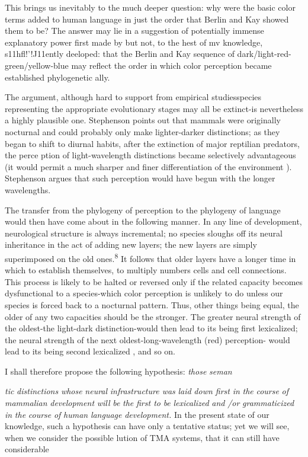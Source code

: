 This brings us inevitably to the much deeper question: why were the basic color terms added to human language in just the order that Berlin and Kay showed them to be? The answer may lie in a suggestion of potentially immense explanatory power first made by \citet{Stephenson1973} but not, to the hest of mv knowledge, s11hfl!'!J11ently deeloped: that the Berlin and Kay sequence of dark/light-red-green/yellow-blue may reflect the order in which color perception became established phylogenetic ally.

The argument, although hard to support from empirical studies\-species representing the appropriate evolutionary stages may all be extinct-is nevertheless a highly plausible one. Stephenson points out that mammals were originally nocturnal and could probably only make
lighter-darker distinctions; as they began to shift to diurnal habits, after the extinction of major reptilian predators, the perce ption of light-wavelength distinctions became selectively advantageous (it 
would permit a much sharper and finer differentiation of the environ\-ment ). Stephenson argues that such perception would have begun with the longer wavelengths.

The transfer from the phylogeny of perception to the phylogeny
of language would then have come about in the following manner. In any line of development, neurological structure is always incremental; no species sloughs off its neural inheritance in the act of adding new layers; the new layers are simply superimposed on the old ones.\textsuperscript{8} It follows that older layers have a longer time in which to establish themselves, to multiply numbers cells and cell connections. This process is likely to be halted or reversed only if the related capacity becomes dysfunctional to a species-which color perception is unlikely to do unless our species is forced back to a nocturnal pattern. Thus, other things being equal, the older of any two capacities should be the stronger. The greater neural strength of the oldest-the light-dark distinction-would then lead to its being first lexicalized; the neural strength of the next oldest-long-wavelength (red) perception- would lead to its being second lexicalized , and so on.

I shall therefore propose the following hypothesis: \textit{those} \textit{seman\-}

\textit{tic} \textit{distinctions} \textit{whose} \textit{neural} \textit{i}\textit{n}\textit{frastructure was} \textit{laid} \textit{down first} \textit{in} \textit{the} \textit{course} \textit{o}\textit{f} \textit{mammalian} \textit{development} \textit{will} \textit{be} \textit{the} \textit{first to} \textit{be} \textit{lexicalized} \textit{and} \textit{/or} \textit{grammaticized in} \textit{the} \textit{course} \textit{o}\textit{f} \textit{human} \textit{language} \textit{development.} In the present state of our knowledge, such a hypothesis can have only a tentative status; yet we will see, when we consider the possible lution of TMA systems, that it can still have considerable

